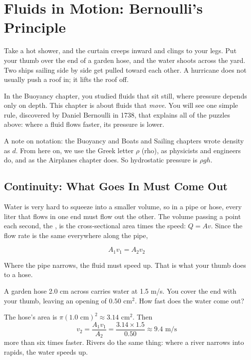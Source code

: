 \chapter{Fluids in Motion: Bernoulli's Principle}

Take a hot shower, and the curtain creeps inward and clings to your legs. Put your thumb over the
end of a garden hose, and the water shoots across the yard. Two ships sailing side by side get
pulled toward each other. A hurricane does not usually push a roof in; it lifts the roof off.

In the Buoyancy chapter, you studied fluids that sit still, where pressure depends only on depth.
This chapter is about fluids that \emph{move}. You will see one simple rule, discovered by Daniel
Bernoulli in 1738, that explains all of the puzzles above: where a fluid flows faster, its pressure
is lower.

A note on notation: the Buoyancy and Boats and Sailing chapters wrote density as $d$. From here on,
we use the Greek letter $\rho$ (rho), as physicists and engineers do, and as the Airplanes chapter
does. So hydrostatic pressure is $\rho gh$.

\section{Continuity: What Goes In Must Come Out}
Water is very hard to squeeze into a smaller volume, so in a pipe or hose, every liter that flows
in one end must flow out the other. The volume passing a point each second, the ,
is the cross-sectional area times the speed: $Q = Av$. Since the flow rate is the same everywhere
along the pipe,

\begin{mdframed}[style = important, frametitle = {The Continuity Equation}]
$$A_1 v_1 = A_2 v_2$$
\end{mdframed}

Where the pipe narrows, the fluid must speed up. That is what your thumb does to a hose.

\begin{Worked}
\begin{Problem}
A garden hose 2.0 cm across carries water at 1.5 m/s. You cover the end with your
thumb, leaving an opening of $0.50$ cm$^2$. How fast does the water come out?
\end{Problem}
\begin{Solution}
The hose's area is $\pi(1.0 \text{ cm})^2 \approx 3.14$ cm$^2$. Then
$$v_2 = \frac{A_1v_1}{A_2} = \frac{3.14 \times 1.5}{0.50} \approx 9.4 \text{ m/s}$$
more than six times faster. Rivers do the same thing: where a river narrows into rapids, the water
speeds up.
\end{Solution}
\end{Worked}

